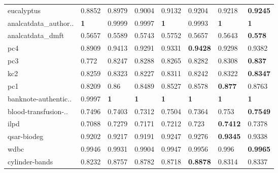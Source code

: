 \begin{tabular}{llllllll}
eucalyptus           &           0.8852 &           0.8979 &           0.9004 &           0.9132 &                   0.9204 &           0.9218 &  \textbf{0.9245} \\
analcatdata_author.. &       \textbf{1} &           0.9999 &           0.9997 &       \textbf{1} &                   0.9993 &       \textbf{1} &       \textbf{1} \\
analcatdata_dmft     &           0.5657 &           0.5589 &           0.5743 &           0.5752 &                   0.5657 &           0.5643 &   \textbf{0.578} \\
pc4                  &           0.8909 &           0.9413 &           0.9291 &           0.9331 &          \textbf{0.9428} &           0.9298 &           0.9382 \\
pc3                  &            0.772 &           0.8247 &           0.8288 &           0.8265 &                   0.8282 &           0.8308 &   \textbf{0.837} \\
kc2                  &           0.8259 &           0.8323 &           0.8227 &           0.8311 &                   0.8242 &           0.8322 &  \textbf{0.8347} \\
pc1                  &           0.8209 &             0.86 &           0.8489 &           0.8527 &                   0.8578 &   \textbf{0.877} &           0.8763 \\
banknote-authentic.. &           0.9997 &       \textbf{1} &       \textbf{1} &       \textbf{1} &               \textbf{1} &       \textbf{1} &       \textbf{1} \\
blood-transfusion-.. &           0.7496 &           0.7403 &           0.7312 &           0.7504 &                   0.7364 &            0.753 &  \textbf{0.7549} \\
ilpd                 &           0.7088 &           0.7279 &           0.7171 &           0.7212 &                    0.723 &  \textbf{0.7412} &           0.7378 \\
qsar-biodeg          &           0.9202 &           0.9217 &           0.9191 &           0.9247 &                   0.9276 &  \textbf{0.9345} &           0.9338 \\
wdbc                 &           0.9946 &           0.9931 &           0.9904 &           0.9947 &                   0.9956 &            0.996 &  \textbf{0.9965} \\
cylinder-bands       &           0.8232 &           0.8757 &           0.8782 &           0.8718 &          \textbf{0.8878} &           0.8314 &           0.8337 \\

\end{tabular}
